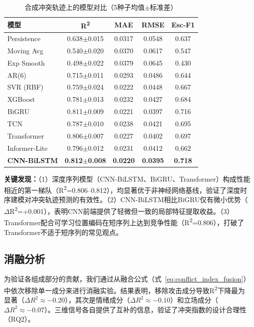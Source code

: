 \documentclass[conference]{IEEEtran}
\begin{document}
\begin{table}[h]
\caption{合成冲突轨迹上的模型对比（5种子均值$\pm$标准差）}
\label{tab:main_results}
\centering
\begin{tabular}{lcccc}
\hline
\textbf{模型} & \textbf{R\textsuperscript{2}} & \textbf{MAE} & \textbf{RMSE} & \textbf{Esc-F1} \\
\hline
Persistence & 0.638$\pm$0.015 & 0.0317 & 0.0548 & 0.637 \\
Moving Avg & 0.540$\pm$0.020 & 0.0370 & 0.0617 & 0.547 \\
Exp Smooth & 0.498$\pm$0.022 & 0.0379 & 0.0645 & 0.430 \\
AR(6) & 0.715$\pm$0.011 & 0.0293 & 0.0486 & 0.644 \\
SVR (RBF) & 0.759$\pm$0.024 & 0.0222 & 0.0448 & 0.667 \\
XGBoost & 0.781$\pm$0.013 & 0.0232 & 0.0427 & 0.684 \\
BiGRU & 0.811$\pm$0.009 & 0.0221 & 0.0397 & 0.716 \\
TCN & 0.787$\pm$0.010 & 0.0238 & 0.0421 & 0.695 \\
Transformer & 0.806$\pm$0.007 & 0.0227 & 0.0402 & 0.697 \\
Informer-Lite & 0.796$\pm$0.012 & 0.0231 & 0.0412 & 0.662 \\
\textbf{CNN-BiLSTM} & \textbf{0.812}$\pm$\textbf{0.008} & \textbf{0.0220} & \textbf{0.0395} & \textbf{0.718} \\
\hline
\end{tabular}
\end{table}

\noindent\textbf{关键发现：}（1）深度序列模型（CNN-BiLSTM、BiGRU、Transformer）构成性能相近的第一梯队（R\textsuperscript{2}=0.806--0.812），均显著优于非神经网络基线，验证了深度时序建模对冲突轨迹预测的有效性。（2）CNN-BiLSTM相比BiGRU仅有微小优势（$\Delta$R\textsuperscript{2}=+0.001），表明CNN前端提供了轻微但一致的局部特征提取收益。（3）Transformer配合可学习位置编码在短序列上达到竞争性能（R\textsuperscript{2}=0.806），打破了Transformer不适于短序列的常见观点。

\subsection{消融分析}

为验证各组成部分的贡献，我们通过从融合公式（式~\ref{eq:conflict_index_fusion}）中依次移除单一成分来进行消融实验。结果表明，移除攻击成分导致R\textsuperscript{2}下降最为显著（$\Delta R^2 \approx -0.20$），其次是情绪成分（$\Delta R^2 \approx -0.10$）和立场成分（$\Delta R^2 \approx -0.07$）。三维信号各自提供了互补的信息，验证了冲突指数的设计合理性（RQ2）。
\end{document}
